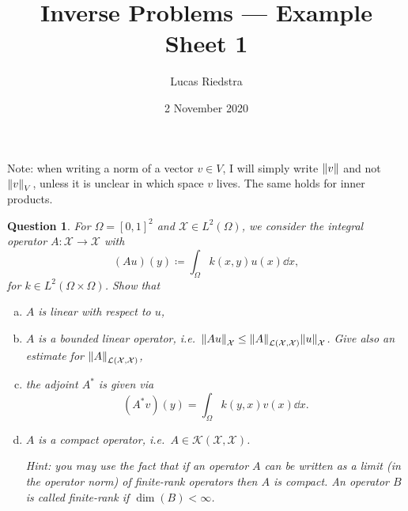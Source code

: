 \documentclass{article}
\title{Inverse Problems --- Example Sheet 1} %
\author{Lucas Riedstra}
\date{2 November 2020} %
\theoremstyle{plain}
\newtheorem{question}{Question}
\theoremstyle{remark}
\newcommand{\Cal}{\mathcal}
\newcommand\ceq\coloneqq %
\newcommand\XX{\Cal X}
\newcommand\LL{\Cal L}
\newcommand\KK{\Cal K}
\begin{document}
\maketitle

\begin{mdframed}
		Note: when writing a norm of a vector $v \in V$, I will simply write $\norm{v}$ and not $\norm{v}_V$, unless it is unclear in which space $v$ lives. The same holds for inner products. 	
\end{mdframed}
\begin{question}
	For $\Omega = [0, 1]^2$ and $\XX \in L^2(\Omega)$, we consider the integral operator $A \colon \XX \to \XX$ with
	\[
	(Au)(y) \ceq \int_\Omega k(x, y) u(x) \dd{x},
	\]
	for $k \in L^2(\Omega \times \Omega)$.  Show that
	\begin{enumerate}[(a)]
		\item $A$ is linear with respect to $u$,
		\item $A$ is a bounded linear operator, i.e.\ $\norm{Au}_\XX \leq \norm{A}_{\LL(\XX, \XX)} \norm{u}_\XX$. Give also an estimate for $\norm{A}_{\LL(\XX, \XX)}$,
		\item the adjoint $A^*$ is given via
		\[
		(A^* v)(y) = \int_\Omega k(y, x) v(x) \dd{x}.
		\]
		\item $A$ is a compact operator, i.e.\ $A \in \KK(\XX, \XX)$. 
		
		\emph{Hint:} you may use the fact that if an operator $A$ can be written as a limit (in the operator norm) of finite-rank operators then $A$ is compact. An operator $B$ is called finite-rank if $\dim(B) < \infty$. 
	\end{enumerate}
\end{question}
\end{document}
